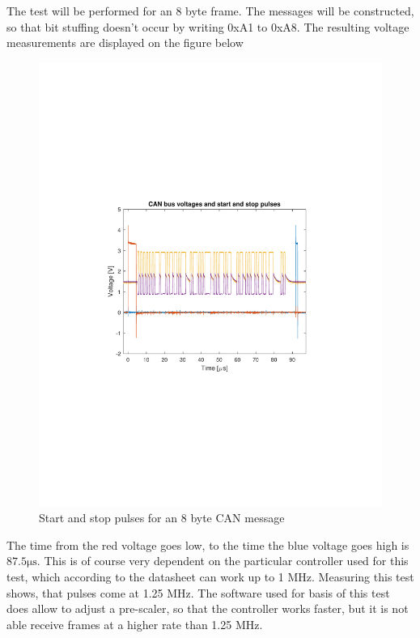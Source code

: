 The test will be performed for an 8 byte frame.
The messages will be constructed, so that bit stuffing doesn't occur by writing 0xA1 to 0xA8. 
The resulting voltage measurements are displayed on the figure below

\begin{figure}[h]
	\centering
	\includegraphics[width = \linewidth]{graphics/CAN_test1_raw}
	\caption{Start and stop pulses for an 8 byte CAN message}
	\label{fig:CAN_test1_raw}
\end{figure}

The time from the red voltage goes low, to the time the blue voltage goes high is $87.5 \si{\micro\second}$.
This is of course very dependent on the particular controller used for this test, which according to the datasheet can work up to 1 MHz.
Measuring this test shows, that pulses come at 1.25 MHz.
The software used for basis of this test does allow to adjust a pre-scaler, so that the controller works faster, but it is not able receive frames at a higher rate than 1.25 MHz.\\

